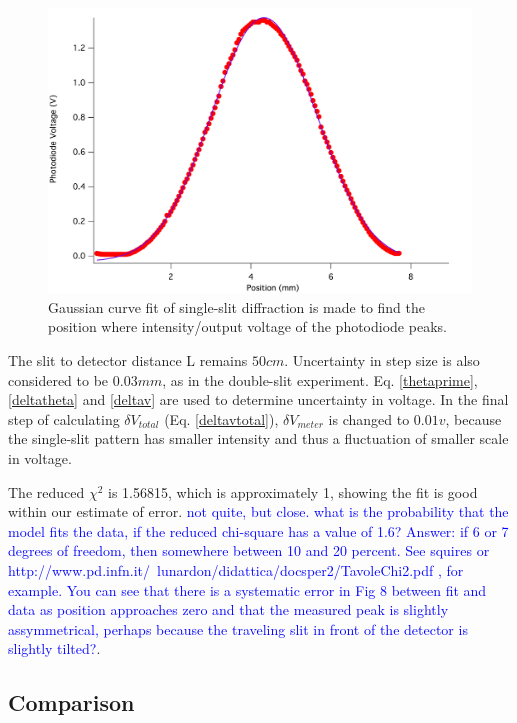 \documentclass[prb,preprint]{revtex4-1}
\begin{document}
\begin{figure}[h]
\centering
\includegraphics[width=7in]{singlegaus.png}
\caption{Gaussian curve fit of single-slit diffraction is made to find the position where intensity/output voltage of the photodiode peaks.}
\label{gasfit2}
\end{figure}

The slit to detector distance L remains $50 cm$. Uncertainty in step size is also considered to be $0.03mm$, as in the double-slit experiment. Eq. \ref{thetaprime}, \ref{deltatheta} and \ref{deltav} are used to determine uncertainty in voltage. In the final step of calculating $\delta V_{total}$ (Eq. \ref{deltavtotal}), $\delta V_{meter}$ is changed to $0.01v$, because the single-slit pattern has smaller intensity and thus a fluctuation of smaller scale in voltage.

The reduced $\chi^2$ is 1.56815, which is approximately 1, showing the fit is good within our estimate of error. \textcolor{blue}{not quite, but close. what is the probability that the model fits the data, if the reduced chi-square has a value of 1.6? Answer: if 6 or 7 degrees of freedom, then somewhere between 10 and 20 percent. See squires or http://www.pd.infn.it/~lunardon/didattica/docsper2/TavoleChi2.pdf , for example. You can see that there is a systematic error in Fig 8 between fit and data as position approaches zero and that the measured peak is slightly assymmetrical, perhaps because the traveling slit in front of the detector is slightly tilted?}. 

\subsection{Comparison}
\end{document}
